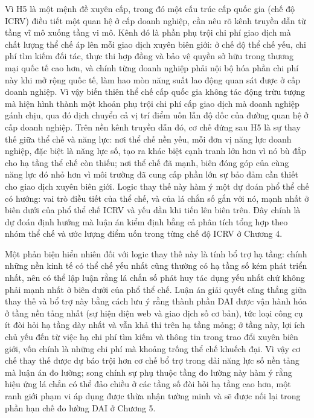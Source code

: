 \documentclass[
  a4paper,
  13pt]{extreport}
\begin{document}
Vì H5 là một mệnh đề xuyên cấp, trong đó một cấu trúc cấp quốc gia (chế
độ ICRV) điều tiết một quan hệ ở cấp doanh nghiệp, cần nêu rõ kênh
truyền dẫn từ tầng vĩ mô xuống tầng vi mô. Kênh đó là phần phụ trội chi
phí giao dịch mà chất lượng thể chế áp lên mỗi giao dịch xuyên biên
giới: ở chế độ thể chế yếu, chi phí tìm kiếm đối tác, thực thi hợp đồng
và bảo vệ quyền sở hữu trong thương mại quốc tế cao hơn, và chính từng
doanh nghiệp phải nội bộ hóa phần chi phí này khi mở rộng quốc tế, làm
hao mòn năng suất lao động quan sát được ở cấp doanh nghiệp. Vì vậy biến
thiên thể chế cấp quốc gia không tác động trừu tượng mà hiện hình thành
một khoản phụ trội chi phí cấp giao dịch mà doanh nghiệp gánh chịu, qua
đó dịch chuyển cả vị trí điểm uốn lẫn độ dốc của đường quan hệ ở cấp
doanh nghiệp. Trên nền kênh truyền dẫn đó, cơ chế đứng sau H5 là sự thay
thế giữa thể chế và năng lực: nơi thể chế nền yếu, mỗi đơn vị năng lực
doanh nghiệp, đặc biệt là năng lực số, tạo ra khác biệt cạnh tranh lớn
hơn vì nó bù đắp cho hạ tầng thể chế còn thiếu; nơi thể chế đã mạnh,
biên đóng góp của cùng năng lực đó nhỏ hơn vì môi trường đã cung cấp
phần lớn sự bảo đảm cần thiết cho giao dịch xuyên biên giới. Logic thay
thế này hàm ý một dự đoán phổ thể chế có hướng: vai trò điều tiết của
thể chế, và của lá chắn số gắn với nó, mạnh nhất ở biên dưới của phổ thể
chế ICRV và yếu dần khi tiến lên biên trên. Đây chính là dự đoán định
hướng mà luận án kiểm định bằng cả phân tích tổng hợp theo nhóm thể chế
và ước lượng điểm uốn trong từng chế độ ICRV ở Chương 4.

Một phản biện hiển nhiên đối với logic thay thế này là tính bổ trợ hạ
tầng: chính những nền kinh tế có thể chế yếu nhất cũng thường có hạ tầng
số kém phát triển nhất, nên có thể lập luận rằng lá chắn số phát huy tác
dụng yếu nhất chứ không phải mạnh nhất ở biên dưới của phổ thể chế. Luận
án giải quyết căng thẳng giữa thay thế và bổ trợ này bằng cách lưu ý
rằng thành phần DAI được vận hành hóa ở tầng nền tảng nhất (sự hiện diện
web và giao dịch số cơ bản), tức loại công cụ ít đòi hỏi hạ tầng dày
nhất và vẫn khả thi trên hạ tầng mỏng; ở tầng này, lợi ích chủ yếu đến
từ việc hạ chi phí tìm kiếm và thông tin trong trao đổi xuyên biên giới,
vốn chính là những chi phí mà khoảng trống thể chế khuếch đại. Vì vậy cơ
chế thay thế được dự báo trội hơn cơ chế bổ trợ trong dải năng lực số
nền tảng mà luận án đo lường; song chính sự phụ thuộc tầng đo lường này
hàm ý rằng hiệu ứng lá chắn có thể đảo chiều ở các tầng số đòi hỏi hạ
tầng cao hơn, một ranh giới phạm vi áp dụng được thừa nhận tường minh và
sẽ được nối lại trong phần hạn chế đo lường DAI ở Chương 5.
\end{document}
